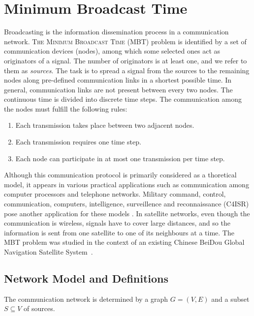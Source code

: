 \chapter{Minimum Broadcast Time}\label{chap:mbt}

Broadcasting is the information dissemination process in a communication network.
\textsc{The Minimum Broadcast Time (MBT)} problem is identified by a set of communication devices (nodes), among which some selected ones act as originators of a signal.
The number of originators is at least one, and we refer to them as \emph{sources}.
The task is to spread a signal from the sources to the remaining nodes along pre-defined communication links in a shortest possible time.
In general, communication links are not present between every two nodes.
The continuous time is divided into discrete time steps.
The communication among the nodes must fulfill the following rules:
\begin{enumerate}
\item Each transmission takes place between two adjacent nodes.
\item Each transmission requires one time step.
\item Each node can participate in at most one transmission per time step.
\end{enumerate}

Although this communication protocol is primarily considered as a thoretical model, 
it appears in various practical applications such as communication among computer processors and telephone networks.
Military command, control, communication, computers, intelligence, surveillence and reconnaissance (C4ISR) pose another application for these models \cite{dekker02}.
In satellite networks, even though the communication is wireless, signals have to cover large distances, 
and so the information is sent from one satellite to one of its neighbours at a time.
The MBT problem was studied in the context of an existing Chinese BeiDou Global Navigation Satellite System~\cite{chu17}.

\section{Network Model and Definitions}

The communication network is determined by a graph $G=(V,E)$ and a subset $S\subseteq V$ of sources.

